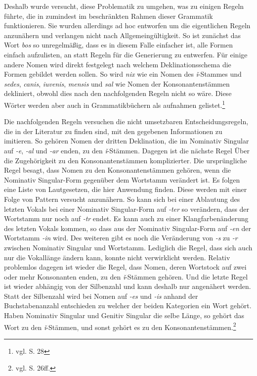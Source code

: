 Deshalb wurde versucht, diese Problematik zu umgehen, was zu einigen Regeln führte, die in zumindest im beschränkten Rahmen dieser Grammatik funktionieren. Sie wurden allerdings ad hoc entworfen um die eigentlichen Regeln anzunähern und verlangen nicht nach Allgemeingültigkeit. So ist zunächst das Wort \textit{bos} so unregelmäßig, dass es in diesem Falle einfacher ist, alle Formen einfach aufzulisten, an statt Regeln für die Generierung zu entwerfen. Für einige andere Nomen wird direkt festgelegt nach welchem Deklinationsschema die Formen gebildet werden sollen. So wird \textit{nix} wie ein Nomen des \textit{ǐ}-Stammes und \textit{sedes}, \textit{canis}, \textit{iuvenis}, \textit{mensis} und \textit{sal} wie Nomen der Konsonantenstämmen dekliniert, obwohl dies nach den nachfolgenden Regeln nicht so wäre. Diese Wörter werden aber auch in Grammatikbüchern als aufnahmen gelistet.\footnote{vgl. \cite{BAYER-LINDAUER1994} S. 28} \par
Die nachfolgenden Regeln versuchen die nicht umsetzbaren Entscheidungsregeln, die in der Literatur zu finden sind, mit den gegebenen Informationen zu imitieren. So gehören Nomen der dritten Deklination, die im Nominativ Singular auf \textit{-e}, \textit{-al} und \textit{-ar} enden, zu den \textit{ǐ}-Stämmen. Dagegen ist die nächste Regel Über die Zugehörigkeit zu den Konsonantenstämmen komplizierter. Die ursprüngliche Regel besagt, dass Nomen zu den Konsonantenstämmen gehören, wenn die Nominativ Singular-Form gegenüber dem Wortstamm verändert ist. Es folgen eine Liste von Lautgesetzen, die hier Anwendung finden. Diese werden mit einer Folge von Pattern versucht anzunähern. So kann sich bei einer Ablautung des letzten Vokals bei einer Nominativ Singular-Form auf \textit{-ter} so verändern, dass der Wortstamm nur noch auf \textit{-tr} endet. Es kann auch zu einer Klangfarbenänderung des letzten Vokals kommen, so dass aus der Nominativ Singular-Form auf \textit{-en} der Wortstamm \textit{-in} wird. Des weiteren gibt es noch die Veränderung von \textit{-s} zu \textit{-r} zwischen Nominativ Singular und Wortstamm. Lediglich die Regel, dass sich auch nur die Vokallänge ändern kann, konnte nicht verwirklicht werden. Relativ problemlos dagegen ist wieder die Regel, dass Nomen, deren Wortstock auf zwei oder mehr Konsonanten enden, zu den \textit{ǐ}-Stämmen gehören. Und die letzte Regel ist wieder abhängig von der Silbenzahl und kann deshalb nur angenähert werden. Statt der Silbenzahl wird bei Nomen auf \textit{-es} und \textit{-is} anhand der Buchstabenanzahl entschieden zu welcher der beiden Kategorien ein Wort gehört. Haben Nominativ Singular und Genitiv Singular die selbe Länge, so gehört das Wort zu den \textit{ǐ}-Stämmen, und sonst gehört es zu den Konsonantenstämmen.\footnote{vgl. \cite{BAYER-LINDAUER1994} S. 26ff.} \par
